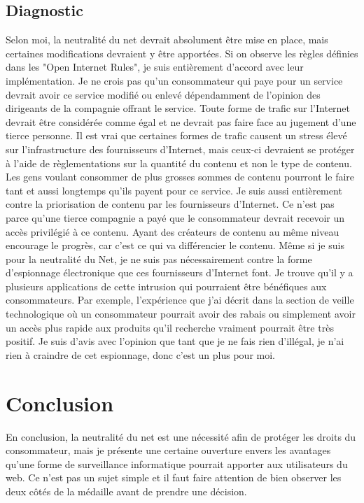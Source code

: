 \documentclass[12pt]{article}
\begin{document}
\subsection{Diagnostic}
Selon moi, la neutralité du net devrait absolument être mise en place, mais certaines modifications devraient y être apportées. Si on observe les règles définies dans les "Open Internet Rules", je suis entièrement d’accord avec leur implémentation. Je ne crois pas qu’un consommateur qui paye pour un service devrait avoir ce service modifié ou enlevé dépendamment de l’opinion des dirigeants de la compagnie offrant le service. Toute forme de trafic sur l’Internet devrait être considérée comme égal et ne devrait pas faire face au jugement d’une tierce personne. Il est vrai que certaines formes de trafic causent un stress élevé sur l’infrastructure des fournisseurs d’Internet, mais ceux-ci devraient se protéger à l’aide de règlementations sur la quantité du contenu et non le type de contenu. Les gens voulant consommer de plus grosses sommes de contenu pourront le faire tant et aussi longtemps qu’ils payent pour ce service. Je suis aussi entièrement contre la priorisation de contenu par les fournisseurs d’Internet. Ce n’est pas parce qu’une tierce compagnie a payé que le consommateur devrait recevoir un accès privilégié à ce contenu. Ayant des créateurs de contenu au même niveau encourage le progrès, car c’est ce qui va différencier le contenu. Même si je suis pour la neutralité du Net, je ne suis pas nécessairement contre la forme d’espionnage électronique que ces fournisseurs d’Internet font. Je trouve qu’il y a plusieurs applications de cette intrusion qui pourraient être bénéfiques aux consommateurs. Par exemple, l’expérience que j’ai décrit dans la section de veille technologique où un consommateur pourrait avoir des rabais ou simplement avoir un accès plus rapide aux produits qu’il recherche vraiment pourrait être très positif. Je suis d’avis avec l’opinion que tant que je ne fais rien d’illégal, je n’ai rien à craindre de cet espionnage, donc c’est un plus pour moi.

\section{Conclusion}
En conclusion, la neutralité du net est une nécessité afin de protéger les droits du consommateur, mais je présente une certaine ouverture envers les avantages qu’une forme de surveillance informatique pourrait apporter aux utilisateurs du web. Ce n’est pas un sujet simple et il faut faire attention de bien observer les deux côtés de la médaille avant de prendre une décision.
\end{document}
